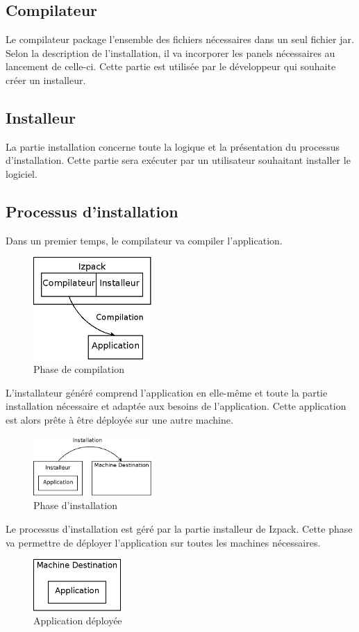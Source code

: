 \subsection{Compilateur}
Le compilateur package l'ensemble des fichiers nécessaires dans un seul fichier jar.
Selon la description de l'installation, il va incorporer les panels nécessaires au lancement de celle-ci.
Cette partie est utilisée par le développeur qui souhaite créer un installeur.
\subsection{Installeur}
La partie installation concerne toute la logique et la présentation du processus d'installation. Cette partie sera exécuter par un utilisateur souhaitant installer le logiciel.
\subsection{Processus d'installation}
Dans un premier temps, le compilateur va compiler l'application.
\begin{figure}[H]
	\centering
	\includegraphics[width=0.4\textwidth]{../image/archi_architecture.png}
	\caption{Phase de compilation}
\end{figure}
L'installateur généré comprend l'application en elle-même et toute la partie installation nécessaire et adaptée aux besoins de l'application.
Cette application est alors prête à être déployée sur une autre machine.
\begin{figure}[H]
	\centering
	\includegraphics[width=0.4\textwidth]{../image/archi_installation.png}
	\caption{Phase d'installation}
\end{figure}
Le processus d'installation est géré par la partie installeur de Izpack. Cette phase va permettre de déployer l'application sur toutes les machines nécessaires.
\begin{figure}[H]
	\centering
	\includegraphics[width=0.3\textwidth]{../image/archi_installe.png}
	\caption{Application déployée}
\end{figure}

